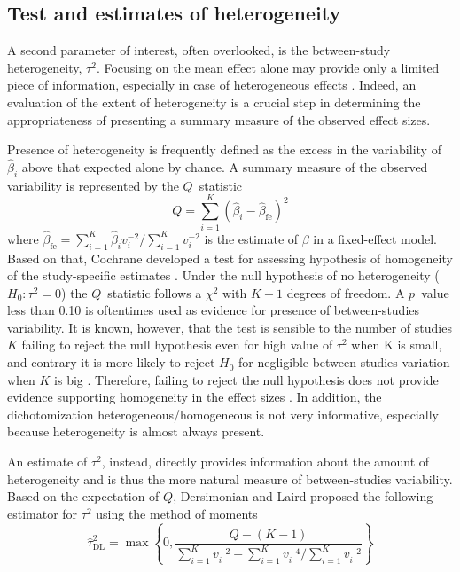 \documentclass[11pt,a4paper,twoside,openany]{book}\usepackage{knitr}
\begin{document}
{\subsection{Test and estimates of heterogeneity}

A second parameter of interest, often overlooked, is the between-study heterogeneity, $\tau^2$. Focusing on the mean effect alone may provide only a limited piece of information, especially in case of heterogeneous effects \citep{borenstein2010basic}. Indeed, an evaluation of the extent of heterogeneity is a crucial step in determining the appropriateness of presenting a summary measure of the observed effect sizes.

Presence of heterogeneity is frequently defined as the excess in the variability of $\hat \beta_i$ above that expected alone by chance. A summary measure of the observed variability is represented by the $Q$~statistic
\begin{equation}
Q = \sum_{i=1}^K \left(\hat \beta_i - \hat \beta_{\text{fe}} \right)^2
\label{eq:Q}
\end{equation}
\noindent where $\hat \beta_{\text{fe}} = \sum_{i=1}^K \hat \beta_i v_i^{-2}/ \sum_{i=1}^K v_i^{-2}$ is the estimate of $\beta$ in a fixed-effect model. Based on that, Cochrane developed a test for assessing hypothesis of homogeneity of the study-specific estimates \citep{cochran1954combination}. Under the null hypothesis of no heterogeneity ($H_0: \tau^2 = 0$) the $Q$~statistic follows a $\chi^2$ with $K-1$ degrees of freedom. A $p$~value less than 0.10 is oftentimes used as evidence for presence of between-studies variability. It is known, however, that the test is sensible to the number of studies $K$ failing to reject the null hypothesis even for high value of $\tau^2$ when K is small, and contrary it is more likely to reject $H_0$ for negligible between-studies variation when $K$ is big \citep{higgins2002quantifying, takkouche1999evaluation}. Therefore, failing to reject the null hypothesis does not provide evidence supporting homogeneity in the effect sizes \citep{biggerstaff1997incorporating}. In addition, the dichotomization heterogeneous/homogeneous is not very informative, especially because heterogeneity is almost always present. 

An estimate of $\tau^2$, instead, directly provides information about the amount of heterogeneity and is thus the more natural measure of between-studies variability. Based on the expectation of $Q$, Dersimonian and Laird proposed the following estimator for $\tau^2$ using the method of moments \citep{dersimonian1986meta}
\begin{equation}
\hat \tau^2_{\text{DL}} = \max \left\{0, \frac{Q - (K-1)}{\sum_{i=1}^K v_i^{-2} - \sum_{i=1}^K v_i^{-4}/\sum_{i=1}^K v_i^{-2} } \right\}
\label{eq:tau2DL}
\end{equation}

}
\end{document}
